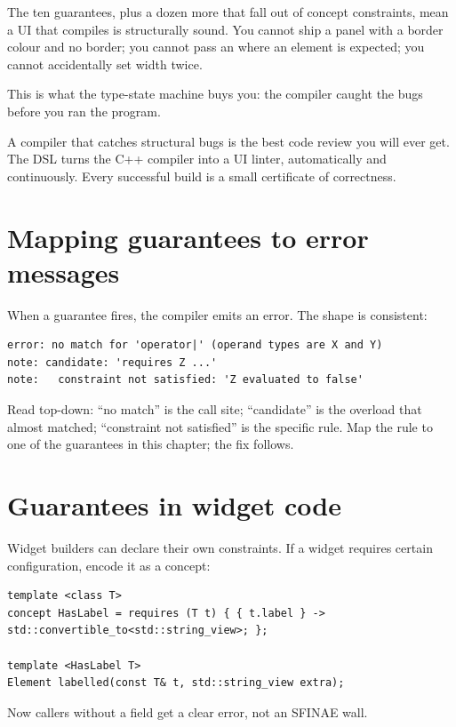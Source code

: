 The ten guarantees, plus a dozen more that fall out of concept
constraints, mean a \maya{} UI that compiles is structurally
sound. You cannot ship a panel with a border colour and no
border; you cannot pass an  where an element is
expected; you cannot accidentally set width twice.

This is what the type-state machine buys you: the compiler
caught the bugs before you ran the program.

\begin{idea}
A compiler that catches structural bugs is the best code review
you will ever get. The DSL turns the C++ compiler into a UI
linter, automatically and continuously. Every successful build is
a small certificate of correctness.
\end{idea}

\section{Mapping guarantees to error messages}

When a guarantee fires, the compiler emits an error. The shape
is consistent:

\begin{lstlisting}
error: no match for 'operator|' (operand types are X and Y)
note: candidate: 'requires Z ...'
note:   constraint not satisfied: 'Z evaluated to false'
\end{lstlisting}

Read top-down: ``no match'' is the call site; ``candidate'' is
the overload that almost matched; ``constraint not satisfied''
is the specific rule. Map the rule to one of the guarantees in
this chapter; the fix follows.

\section{Guarantees in widget code}

Widget builders can declare their own constraints. If a widget
requires certain configuration, encode it as a concept:

\begin{lstlisting}
template <class T>
concept HasLabel = requires (T t) { { t.label } -> std::convertible_to<std::string_view>; };

template <HasLabel T>
Element labelled(const T& t, std::string_view extra);
\end{lstlisting}

Now callers without a  field get a clear error,
not an SFINAE wall.

